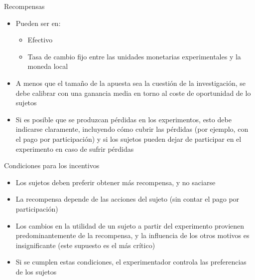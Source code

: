 \documentclass[
  ignorenonframetext,
]{beamer}
\providecommand{\tightlist}{%
  \setlength{\itemsep}{0pt}\setlength{\parskip}{0pt}}
\begin{document}
\begin{frame}{Recompensas}
\protect\hypertarget{recompensas}{}
\begin{itemize}
\item
  Pueden ser en:

  \begin{itemize}
  \tightlist
  \item
    Efectivo
  \item
    Tasa de cambio fijo entre las unidades monetarias experimentales y
    la moneda local
  \end{itemize}
\item
  A menos que el tamaño de la apuesta sea la cuestión de la
  investigación, se debe calibrar con una ganancia media en torno al
  coste de oportunidad de lo sujetos
\item
  Si es posible que se produzcan pérdidas en los experimentos, esto debe
  indicarse claramente, incluyendo cómo cubrir las pérdidas (por
  ejemplo, con el pago por participación) y si los sujetos pueden dejar
  de participar en el experimento en caso de sufrir pérdidas
\end{itemize}
\end{frame}

\begin{frame}{Condiciones para los incentivos}
\protect\hypertarget{condiciones-para-los-incentivos}{}
\begin{itemize}
\item
  Los sujetos deben preferir obtener más recompensa, y no saciarse
\item
  La recompensa depende de las acciones del sujeto (sin contar el pago
  por participación)
\item
  Los cambios en la utilidad de un sujeto a partir del experimento
  provienen predominantemente de la recompensa, y la influencia de los
  otros motivos es insignificante (este supuesto es el más crítico)
\item
  Si se cumplen estas condiciones, el experimentador controla las
  preferencias de los sujetos
\end{itemize}
\end{frame}
\end{document}
